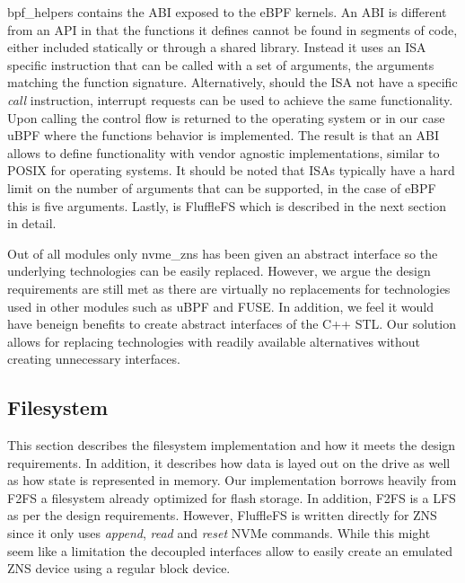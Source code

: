 bpf\_helpers contains the ABI exposed to the eBPF kernels. An ABI is different
from an API in that the functions it defines cannot be found in segments of
code, either included statically or through a shared library. Instead it uses
an ISA specific instruction that can be called with a set of arguments, the
arguments matching the function signature. Alternatively, should the ISA not
have a specific \textit{call} instruction, interrupt requests can be used to
achieve the same functionality. Upon calling the control flow is returned to
the operating system or in our case uBPF where the functions behavior is
implemented. The result is that an ABI allows to define functionality with
vendor agnostic implementations, similar to POSIX for operating systems. It
should be noted that ISAs typically have a hard limit on the number of arguments
that can be supported, in the case of eBPF this is five arguments. Lastly, is
FluffleFS which is described in the next section in detail.

Out of all modules only nvme\_zns has been given an abstract interface so the
underlying technologies can be easily replaced. However, we argue the design
requirements are still met as there are virtually no replacements for
technologies used in other modules such as uBPF and FUSE\footnotemark[11].
In addition, we feel it would have beneign benefits to create abstract
interfaces of the C++ STL. Our solution allows for replacing technologies with
readily available alternatives without creating unnecessary interfaces.


\subsection{Filesystem}

This section describes the filesystem implementation and how it meets the design
requirements. In addition, it describes how data is layed out on the drive as
well as how state is represented in memory. Our implementation borrows heavily
from F2FS \cite{Lee2015F2FSAN} a filesystem already optimized for flash storage.
In addition, F2FS is a LFS as per the design requirements. However, FluffleFS is
written directly for ZNS since it only uses \textit{append}, \textit{read} and
\textit{reset} NVMe commands. While this might seem like a limitation the
decoupled interfaces allow to easily create an emulated ZNS device using a
regular block device.

